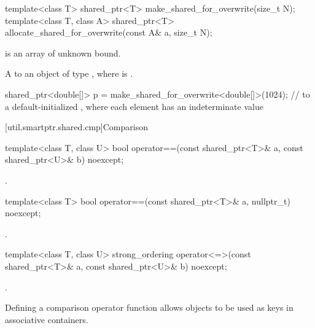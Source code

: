 %
%
\begin{itemdecl}
template<class T>
  shared_ptr<T> make_shared_for_overwrite(size_t N);
template<class T, class A>
  shared_ptr<T> allocate_shared_for_overwrite(const A& a, size_t N);
\end{itemdecl}

\begin{itemdescr}
\pnum
\constraints
{} is an array of unknown bound.

\pnum
\returns
A  to an object of type ,
where  is .

\pnum
\begin{example}
\begin{codeblock}
shared_ptr<double[]> p = make_shared_for_overwrite<double[]>(1024);
  //  to a default-initialized , where each element has an indeterminate value
\end{codeblock}
\end{example}
\end{itemdescr}

[util.smartptr.shared.cmp]{Comparison}

%
\begin{itemdecl}
template<class T, class U>
  bool operator==(const shared_ptr<T>& a, const shared_ptr<U>& b) noexcept;
\end{itemdecl}

\begin{itemdescr}
\pnum
\returns
{}.
\end{itemdescr}

%
\begin{itemdecl}
template<class T>
  bool operator==(const shared_ptr<T>& a, nullptr_t) noexcept;
\end{itemdecl}

\begin{itemdescr}
\pnum
\returns
{}.
\end{itemdescr}

%
\begin{itemdecl}
template<class T, class U>
  strong_ordering operator<=>(const shared_ptr<T>& a, const shared_ptr<U>& b) noexcept;
\end{itemdecl}

\begin{itemdescr}
\pnum
\returns
{}.

\pnum
\begin{note}
Defining a comparison operator function allows  objects
to be used as keys in associative containers.
\end{note}
\end{itemdescr}

